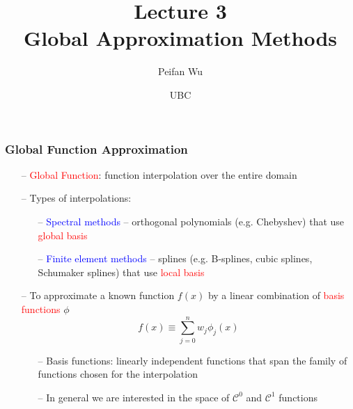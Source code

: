 \documentclass[aspectratio=169, 11pt]{beamer}
\begin{document}
\title{Lecture 3 \\ Global Approximation Methods}
\author[Wu]{Peifan Wu}
\date{UBC}

\begin{frame}
\titlepage
\end{frame}

\begin{frame}
\frametitle{Global Function Approximation}
  \begin{itemize}
    \item[--] \textcolor{red}{Global Function}: function interpolation over the entire domain
    \bigskip
    \item[--] Types of interpolations:
    \begin{itemize}
      \medskip
      \item[--] \textcolor{blue}{Spectral methods} -- orthogonal polynomials (e.g. Chebyshev) that use \textcolor{red}{global basis}
      \medskip
      \item[--] \textcolor{blue}{Finite element methods} -- splines (e.g. B-splines, cubic splines, Schumaker splines) that use \textcolor{red}{local basis}
    \end{itemize}
    \bigskip
    \item[--] To approximate a known function $f\left(x\right)$ by a linear combination of \textcolor{red}{basis functions} $\phi$
    \[
      f\left(x\right)\equiv\sum_{j=0}^{n}w_{j}\phi_{j}\left(x\right)
    \]
    \begin{itemize}
      \item[--] Basis functions: linearly independent functions that span the family of functions chosen for the interpolation
      \medskip
      \item[--] In general we are interested in the space of $\mathcal{C}^{0}$ and $\mathcal{C}^{1}$ functions
    \end{itemize}
  \end{itemize}
\end{frame}
\end{document}
